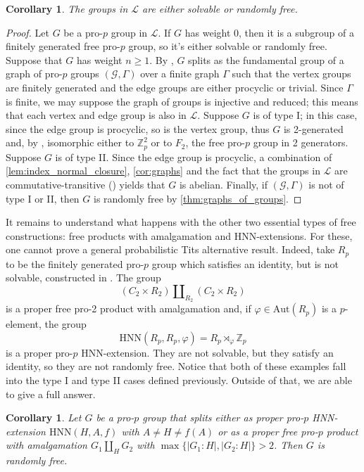 \documentclass[a4paper,10pt]{amsart}
\theoremstyle{plain}
\newtheorem{corollary}[thm]{Corollary}
\theoremstyle{definition}
\numberwithin{equation}{section}
\begin{document}
\begin{corollary}
    The groups in $\mathcal L$ are either solvable or randomly free.
\end{corollary}
\begin{proof}
    Let $G$ be a pro-$p$ group in $\mathcal L$. If $G$ has weight 0, then it is a subgroup of a finitely generated free pro-$p$ group, so it's either solvable or randomly free. Suppose that $G$ has weight $n\geq 1$. By \cite[Theorem B]{SZ14}, $G$ splits as the fundamental group of a graph of pro-$p$ groups $(\mathcal G, \Gamma)$ over a finite graph $\Gamma$ such that the vertex groups are finitely generated and the edge groups are either procyclic or trivial. Since $\Gamma$ is finite, we may suppose the graph of groups is injective and reduced; this means that each vertex and edge group is also in $\mathcal L$. Suppose $G$ is of type I; in this case, since the edge group is procyclic, so is the vertex group, thus $G$ is 2-generated and, by \cite[Theorem 7.3]{SZ14}, isomorphic either to $\mathbb Z_p^2$ or to $F_2$, the free pro-$p$ group in 2 generators. Suppose $G$ is of type II. Since the edge group is procyclic, a combination of \cref{lem:index_normal_closure}, \cref{cor:graphs} and the fact that the groups in $\mathcal L$ are commutative-transitive (\cite[Theorem 5.1]{KZ}) yields that $G$ is abelian. Finally, if $(\mathcal G, \Gamma)$ is not of type I or II, then $G$ is randomly free by \cref{thm:graphs_of_groups}. 
\end{proof}

It remains to understand what happens with the other two essential types of free constructions: free products with amalgamation and HNN-extensions. For these, one cannot prove a general probabilistic Tits alternative result. Indeed, take $R_p$ to be the finitely generated pro-$p$ group which satisfies an identity, but is not solvable, constructed in \cite[Corollary 10]{CM07}. The group 
\[(C_2 \times R_2) \amalg_{R_2}(C_2 \times R_2)\] is a proper free pro-2 product with amalgamation and, if $\varphi \in \mathrm{Aut}(R_p)$ is a $p$-element, the group 
\[\mathrm{HNN}(R_p,R_p,\varphi) = R_p \rtimes_\varphi \mathbb Z_p \] 
is a proper pro-$p$ HNN-extension. They are not solvable, but they satisfy an identity, so they are not randomly free. Notice that both of these examples fall into the type I and type II cases defined previously. Outside of that, we are able to give a full answer.

\begin{corollary}
    Let $G$ be a pro-$p$ group that splits either as proper pro-$p$ HNN-extension $\mathrm{HNN}(H,A,f)$ with $A\neq H\neq f(A)$ or as a proper free pro-$p$ product with amalgamation $G_1\amalg_H G_2$ with $\max \{|G_1:H|,|G_2:H|\} > 2$. Then $G$ is randomly free.
\end{corollary}
\end{document}
